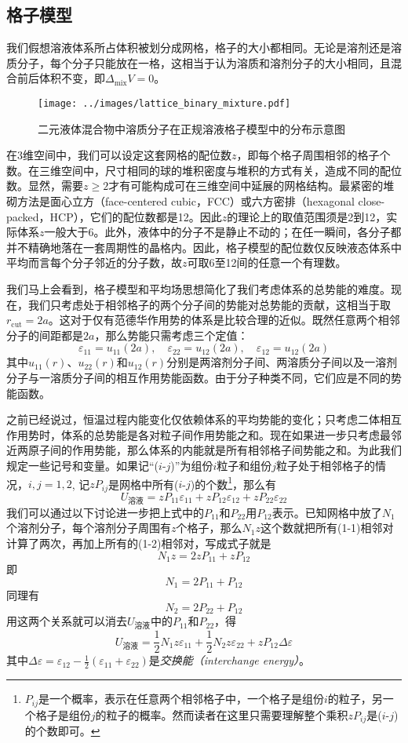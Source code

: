 \documentclass[main.tex]{subfiles}
\begin{document}
\subsection{格子模型}
我们假想溶液体系所占体积被划分成网格，格子的大小都相同。无论是溶剂还是溶质分子，每个分子只能放在一格，这相当于认为溶质和溶剂分子的大小相同，且混合前后体积不变，即$\Delta_\text{mix}V=0$。

\begin{wrapfigure}{r}{0.333\textwidth}
    \centering
    \texttt{[image: ../images/lattice\_binary\_mixture.pdf]}
    \caption{二元液体混合物中溶质分子在正规溶液格子模型中的分布示意图}
    \label{fig:lattice_binary_mixture}
\end{wrapfigure}

在3维空间中，我们可以设定这套网格的配位数$z$，即每个格子周围相邻的格子个数。在三维空间中，尺寸相同的球的堆积密度与堆积的方式有关，造成不同的配位数。显然，需要$z\geq 2$才有可能构成可在三维空间中延展的网格结构。最紧密的堆砌方法是面心立方（face-centered cubic，FCC）或六方密排（hexagonal close-packed，HCP），它们的配位数都是\num{12}。因此$z$的理论上的取值范围须是\num{2}到\num{12}，实际体系$z$一般大于\num{6}。此外，液体中的分子不是静止不动的；在任一瞬间，各分子都并不精确地落在一套周期性的晶格内。因此，格子模型的配位数仅反映液态体系中平均而言每个分子邻近的分子数，故$z$可取6至12间的任意一个有理数。

我们马上会看到，格子模型和平均场思想简化了我们考虑体系的总势能的难度。现在，我们只考虑处于相邻格子的两个分子间的势能对总势能的贡献，这相当于取$r_\text{cut}=2a$。这对于仅有范德华作用势的体系是比较合理的近似。既然任意两个相邻分子的间距都是$2a$，那么势能只需考虑三个定值：
\[\varepsilon_{11}=u_{11}\left(2a\right),\quad\varepsilon_{22}=u_{12}\left(2a\right),\quad\varepsilon_{12}=u_{12}\left(2a\right)\]
其中$u_{11}\left(r\right)$、$u_{22}\left(r\right)$和$u_{12}\left(r\right)$分别是两溶剂分子间、两溶质分子间以及一溶剂分子与一溶质分子间的相互作用势能函数。由于分子种类不同，它们应是不同的势能函数。

之前已经说过，恒温过程内能变化仅依赖体系的平均势能的变化；只考虑二体相互作用势时，体系的总势能是各对粒子间作用势能之和。现在如果进一步只考虑最邻近两原子间的作用势能，那么体系的内能就是所有相邻格子间势能之和。为此我们规定一些记号和变量。如果记“($i$-$j$)”为组份$i$粒子和组份$j$粒子处于相邻格子的情况，$i,j=1,2$, 记$z P_{ij}$是网格中所有($i$-$j$)的个数\footnote{$P_{ij}$是一个概率，表示在任意两个相邻格子中，一个格子是组份$i$的粒子，另一个格子是组份$j$的粒子的概率。然而读者在这里只需要理解整个乘积$z P_{ij}$是($i$-$j$)的个数即可。}，那么有
\[U_\text{溶液}=zP_{11}\varepsilon_{11}+zP_{12}\varepsilon_{12}+zP_{22}\varepsilon_{22}\]
我们可以通过以下讨论进一步把上式中的$P_{11}$和$P_{22}$用$P_{12}$表示。已知网格中放了$N_1$个溶剂分子，每个溶剂分子周围有$z$个格子，那么$N_1 z$这个数就把所有(1-1)相邻对计算了两次，再加上所有的(1-2)相邻对，写成式子就是
\[N_1z=2zP_{11}+zP_{12}\]
即
\[N_1=2P_{11}+P_{12}\]
同理有
\[N_2=2P_{22}+P_{12}\]
用这两个关系就可以消去$U_\text{溶液}$中的$P_{11}$和$P_{22}$，得
\[
    U_\text{溶液}=\frac{1}{2}N_1z\varepsilon_{11}+\frac{1}{2}N_2z\varepsilon_{22}+zP_{12}\Delta\varepsilon
\]
其中$\Delta\varepsilon=\varepsilon_{12}-\frac{1}{2}\left(\varepsilon_{11}+\varepsilon_{22}\right)$是\emph{交换能（interchange energy）}。
\end{document}

